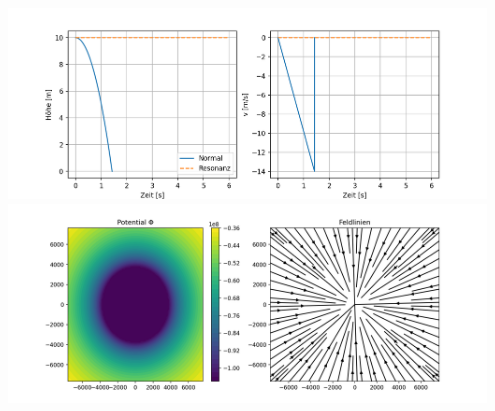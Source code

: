 \documentclass[a4paper,11pt]{article}
\begin{document}
\begin{center}
\includegraphics[width=0.95\textwidth]{drop.png}\\
\includegraphics[width=0.95\textwidth]{field.png}
\end{center}
\end{document}
